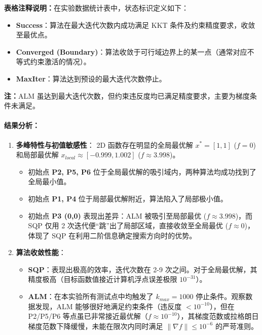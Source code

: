 \documentclass[a4paper,12pt]{article}
\begin{document}
\begin{table}[H]
{\begin{flushleft}
    \textbf{表格注释说明：}在实验数据统计表中，状态标识定义如下：
    \begin{itemize}
        \setlength\itemsep{0pt}  %
        \setlength\parsep{0pt}   %
        \setlength{\leftmargin}{1.5em} %
        \item \textbf{Success}：算法在最大迭代次数内成功满足 KKT 条件及约束精度要求，收敛至最优点。
        \item \textbf{Converged (Boundary)}：算法收敛于可行域边界上的某一点（通常对应不等式约束激活的情况）。
        \item \textbf{MaxIter}：算法达到预设的最大迭代次数停止。
    \end{itemize}
    \textbf{注：}ALM 虽达到最大迭代次数，但约束违反度均已满足精度要求，主要为梯度条件未满足。
\end{flushleft}
}
\end{table}

\paragraph{结果分析：}

\begin{enumerate}
    \item \textbf{多峰特性与初值敏感性}：
    2D 函数存在明显的全局最优解 $x^*=[1, 1]$ ($f=0$) 和局部最优解 $x_{local} \approx [-0.999, 1.002]$ ($f \approx 3.998$)。
    \begin{itemize}
        \item 初始点 \textbf{P2, P5, P6} 位于全局最优解的吸引域内，两种算法均成功找到了全局最小值。
        \item 初始点 \textbf{P1, P4} 位于局部最优解附近，算法陷入了局部极小值。
        \item 初始点 \textbf{P3 (0,0)} 表现出差异：ALM 被吸引至局部最优 ($f \approx 3.998$)，而 SQP 仅用 2 次迭代便“跳”出了局部区域，直接收敛至全局最优 ($f \approx 0$)，体现了 SQP 在利用二阶信息确定搜索方向时的优势。
    \end{itemize}
    
    \item \textbf{算法收敛性能}：
    \begin{itemize}
        \item \textbf{SQP}：表现出极高的效率，迭代次数在 2-9 次之间。对于全局最优解，其精度极高（目标函数值接近计算机浮点误差极限 $10^{-31}$）。
        \item \textbf{ALM}：在本实验所有测试点中均触发了 $k_{max}=1000$ 停止条件。观察数据发现，ALM 能够很好地满足约束条件（违反度 $< 10^{-10}$），但在 P2/P5/P6 等点虽已非常接近最优解（$f \approx 10^{-10}$），其梯度范数或拉格朗日梯度范数下降缓慢，未能在限次内同时满足 $\|\nabla f\| \le 10^{-6}$ 的严苛准则。
    \end{itemize}
\end{enumerate}
\end{document}
